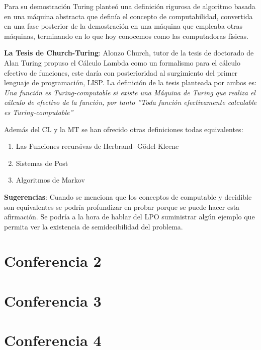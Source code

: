 \documentclass[]{article}
\begin{document}
Para su demostración Turing planteó una definición rigurosa de algoritmo basada en una máquina abstracta que definía el concepto de computabilidad, convertida en una fase posterior de la demostración en una máquina que empleaba otras máquinas, terminando en lo que hoy conocemos como las computadoras físicas.

\textbf{La Tesis de Church-Turing}: Alonzo Church, tutor de la tesis de doctorado de Alan Turing propuso el Cálculo Lambda como un formalismo para el cálculo efectivo de funciones, este daría con posterioridad al surgimiento del primer lenguaje de programación, LISP. La definición de la tesis planteada por ambos es: \textit{Una función es Turing-computable si existe una Máquina de Turing que realiza el cálculo de efectivo de la función, por tanto ''Toda función efectivamente calculable es Turing-computable''}

Además del CL y la MT se han ofrecido otras definiciones todas equivalentes:
\begin{enumerate}
	\item Las Funciones recursivas de Herbrand- Gödel-Kleene 
	\item Sistemas de Post  
	\item Algoritmos de Markov
\end{enumerate}

\textbf{Sugerencias}: Cuando se menciona que los conceptos de computable y decidible son equivalentes se podría profundizar en probar porque se puede hacer esta afirmación. Se podría a la hora de hablar del LPO suministrar algún ejemplo que permita ver la existencia de semidecibilidad del problema.


\section*{Conferencia 2}


\section*{Conferencia 3}


\section*{Conferencia 4}
\end{document}

